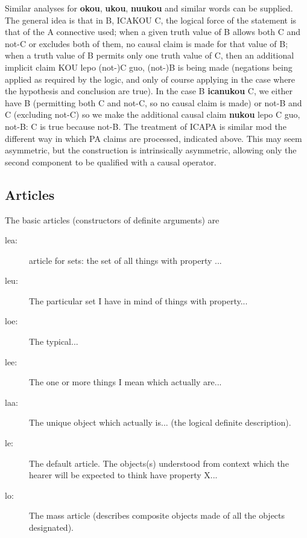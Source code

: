 \documentclass[12pt]{book}
\begin{document}
{Similar analyses for {\bf okou}, {\bf ukou}, {\bf nuukou} and similar words can be supplied.  The general idea is that in B, ICAKOU C, the logical force of the statement is that of the A connective used;  when a given truth value of B allows both C and not-C or excludes both of them, no causal claim is made for that value of B;  when a truth value of B permits only one truth value of C, then an additional implicit claim KOU lepo (not-)C guo, (not-)B is being made (negations being applied as required by the logic, and only of course applying in the case where the hypothesis and conclusion are true).  In the case B {\bf icanukou} C, we either have B (permitting both C and not-C, so no causal claim is made) or not-B and C (excluding not-C) so we make the additional causal claim {\bf nukou} lepo C guo, not-B:  C is true because not-B.  The treatment of ICAPA is similar mod the different way in which PA claims are processed, indicated above.
This may seem asymmetric, but the construction is intrinsically asymmetric, allowing only the second component to be qualified with a causal operator.

\subsection{Articles}

The basic articles (constructors of definite arguments) are 

\begin{description}
\item[lea:]  article for sets:  the set of all things with property ...

 \item[leu:]   The particular set I have in mind of things with property... 

 \item[loe:]  The typical...

 \item[lee:]   The one or more things I mean which actually are...

\item[laa:]  The unique object which actually is... (the logical definite description).

 \item[le:]   The default article.  The objects(s) understood from context which the hearer will be expected to think have property X...

\item[lo:]  The mass article (describes composite objects made of all the objects designated).


\end{description}}
\end{document}
